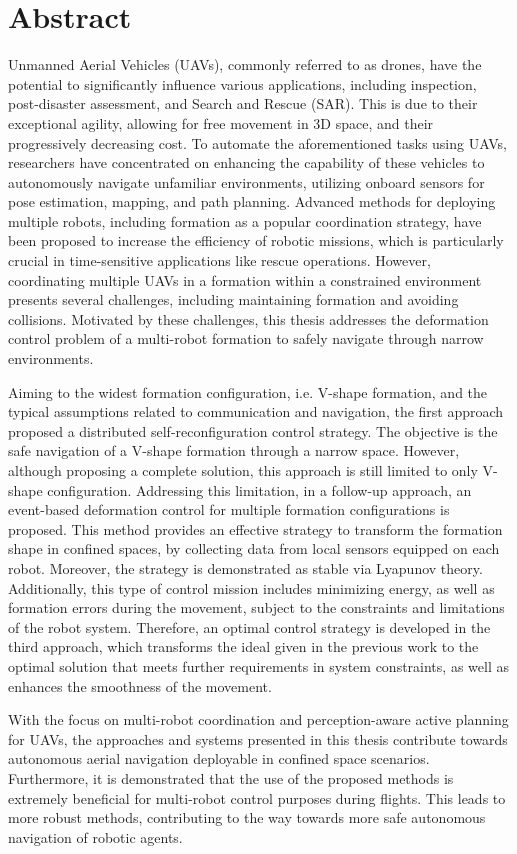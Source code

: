 \chapter*{Abstract}

Unmanned Aerial Vehicles (UAVs), commonly referred to as drones, have the potential to significantly influence various applications, including inspection, post-disaster assessment, and Search and Rescue (SAR). This is due to their exceptional agility, allowing for free movement in 3D space, and their progressively decreasing cost. To automate the aforementioned tasks using UAVs, researchers have concentrated on enhancing the capability of these vehicles to autonomously navigate unfamiliar environments, utilizing onboard sensors for pose estimation, mapping, and path planning. Advanced methods for deploying multiple robots, including formation as a popular coordination strategy, have been proposed to increase the efficiency of robotic missions, which is particularly crucial in time-sensitive applications like rescue operations. However, coordinating multiple UAVs in a formation within a constrained environment presents several challenges, including maintaining formation and avoiding collisions. Motivated by these challenges, this thesis addresses the deformation control problem of a multi-robot formation to safely navigate through narrow environments.

Aiming to the widest formation configuration, i.e. V-shape formation, and the typical assumptions related to communication and navigation, the first approach proposed a distributed self-reconfiguration control strategy. The objective is the safe navigation of a V-shape formation through a narrow space. However, although proposing a complete solution, this approach is still limited to only V-shape configuration. Addressing this limitation, in a follow-up approach, an event-based deformation control for multiple formation configurations is proposed. This method provides an effective strategy to transform the formation shape in confined spaces, by collecting data from local sensors equipped on each robot. Moreover, the strategy is demonstrated as stable via Lyapunov theory. Additionally, this type of control mission includes minimizing energy, as well as formation errors during the movement, subject to the constraints and limitations of the robot system. Therefore, an optimal control strategy is developed in the third approach, which transforms the ideal given in the previous work to the optimal solution that meets further requirements in system constraints, as well as enhances the smoothness of the movement.

With the focus on multi-robot coordination and perception-aware active planning for UAVs, the approaches and systems presented in this thesis contribute towards autonomous aerial navigation deployable in confined space scenarios. Furthermore, it is demonstrated that the use of the proposed methods is extremely beneficial for multi-robot control purposes during flights. This leads to more robust methods, contributing to the way towards more safe autonomous navigation of robotic agents.